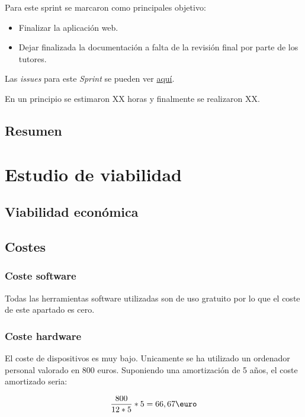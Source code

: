 Para este sprint se marcaron como principales objetivo:
\begin{itemize}
	\item Finalizar la aplicación web.
	\item Dejar finalizada la documentación a falta de la revisión final por parte de los tutores.
\end{itemize} 

Las \emph{issues} para este \emph{Sprint} se pueden ver \href{https://github.com/psnti/TFG-Pablo-Santidrian-Tudanca/milestone/11}{aquí}.


En un principio se estimaron XX horas y finalmente se realizaron XX.

\subsection{Resumen}

\section{Estudio de viabilidad}

\subsection{Viabilidad económica}

\subsection{Costes}
\subsubsection{Coste software}
Todas las herramientas software utilizadas son de uso gratuito por lo que el coste de este apartado es cero.
\subsubsection{Coste hardware}
El coste de dispositivos es muy bajo. Unicamente se ha utilizado un ordenador personal valorado en 800 euros. Suponiendo una amortización de 5 años, el coste amortizado seria:

\begin{equation}
\frac{800}{12 * 5} * 5 = 66,67  \text{\euro}
\end{equation}

